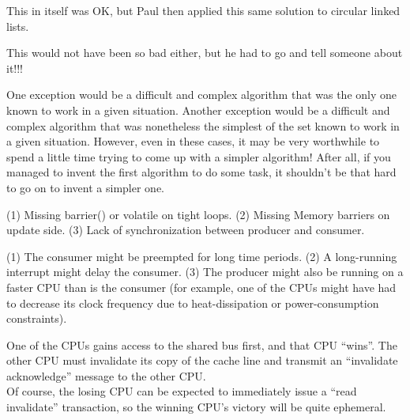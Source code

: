 	This in itself was OK, but Paul then applied this same solution to
	circular linked lists.

	This would not have been so bad either, but he had to go and tell
	someone about it!!!


	One exception would be a difficult and complex algorithm that
	was the only one known to work in a given situation.
	Another exception would be a difficult and complex algorithm
	that was nonetheless the simplest of the set known to work in
	a given situation.
	However, even in these cases, it may be very worthwhile to spend
	a little time trying to come up with a simpler algorithm!
	After all, if you managed to invent the first algorithm
	to do some task, it shouldn't be that hard to go on to
	invent a simpler one.


(1)	Missing barrier() or volatile on tight loops.
(2)	Missing Memory barriers on update side.
(3)	Lack of synchronization between producer and consumer.


(1)	The consumer might be preempted for long time periods.
(2)	A long-running interrupt might delay the consumer.
(3)	The producer might also be running on a faster CPU than is the
	consumer (for example, one of the CPUs might have had to decrease its
	clock frequency due to heat-dissipation or power-consumption
	constraints).

One of the CPUs gains access
to the shared bus first,
and that CPU ``wins''.  The other CPU must invalidate its copy of the
cache line and transmit an ``invalidate acknowledge'' message
to the other CPU. \\
Of course, the losing CPU can be expected to immediately issue a
``read invalidate'' transaction, so the winning CPU's victory will
be quite ephemeral.


